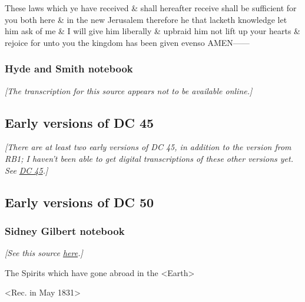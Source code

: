 			These laws which ye have received \& shall hereafter receive shall be sufficient for you both here \& in the new Jerusalem therefore he that lacketh knowledge let him ask of me \& I will give him liberally \& upbraid him not lift up your hearts \& rejoice for unto you the kingdom has been given evenso AMEN------
			
		\subsubsection{Hyde and Smith notebook}
			\label{EXSS-DC42-EARLY-HS}
			
			\textit{[The transcription for this source appears not to be available online.]}
			
	\subsection{Early versions of DC 45}
		\label{EXSS-DC45-EARLY}
			
		\textit{[There are at least two early versions of DC 45, in addition to the version from RB1; I haven't been able to get digital transcriptions of these other versions yet. See} \hyperref[DC45]{\textit{DC 45}}\textit{.]}
		
	\subsection{Early versions of DC 50}
		\label{EXSS-DC50-EARLY}
		
			\subsubsection{Sidney Gilbert notebook}
				\label{EXSS-DC50-EARLY-GILBERT}
				
				\textit{[See this source \href{https://www.josephsmithpapers.org/paper-summary/revelation-9-may-1831-as-recorded-in-gilbert-notebook-dc-50/1}{here}.]}
				
				\begin{tightcenter}
					The Spirits which have gone abroad in the <Earth>
				\end{tightcenter}

				<Rec. in May 1831>

